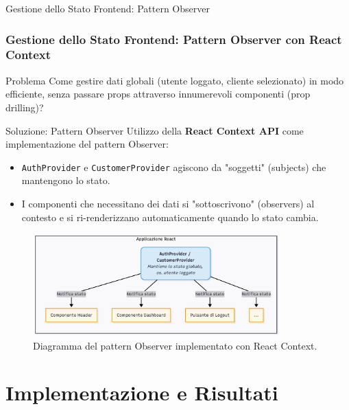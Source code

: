 \documentclass[8pt]{beamer}
\begin{document}
\begin{frame}{Gestione dello Stato Frontend: Pattern Observer}
    \frametitle{Gestione dello Stato Frontend: Pattern Observer con React Context}
    
    \begin{alertblock}{Problema}
        Come gestire dati globali (utente loggato, cliente selezionato) in modo efficiente, senza passare props attraverso innumerevoli componenti (prop drilling)?
    \end{alertblock}

    \begin{block}{Soluzione: Pattern Observer}
        Utilizzo della \textbf{React Context API} come implementazione del pattern Observer:
        \begin{itemize}
            \item \texttt{AuthProvider} e \texttt{CustomerProvider} agiscono da "soggetti" (subjects) che mantengono lo stato.
            \item I componenti che necessitano dei dati si "sottoscrivono" (observers) al contesto e si ri-renderizzano automaticamente quando lo stato cambia.
        \end{itemize}
    \end{block}

    \vfill %

    \begin{figure}
        \centering
        \includegraphics[width=0.85\textwidth]{figures/observer.png}
        \caption{Diagramma del pattern Observer implementato con React Context.}
    \end{figure}
    
\end{frame}
\section{Implementazione e Risultati}
\end{document}
